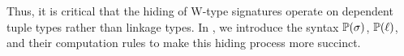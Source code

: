 %
%

Thus, it is critical that the hiding of W-type signatures operate on dependent
tuple types rather than linkage types.
In \TT, we introduce the syntax $\mathbb{P}({\sigma})$, $\mathbb{P}({\ell})$, and their computation rules to make
this hiding process more succinct.







%

